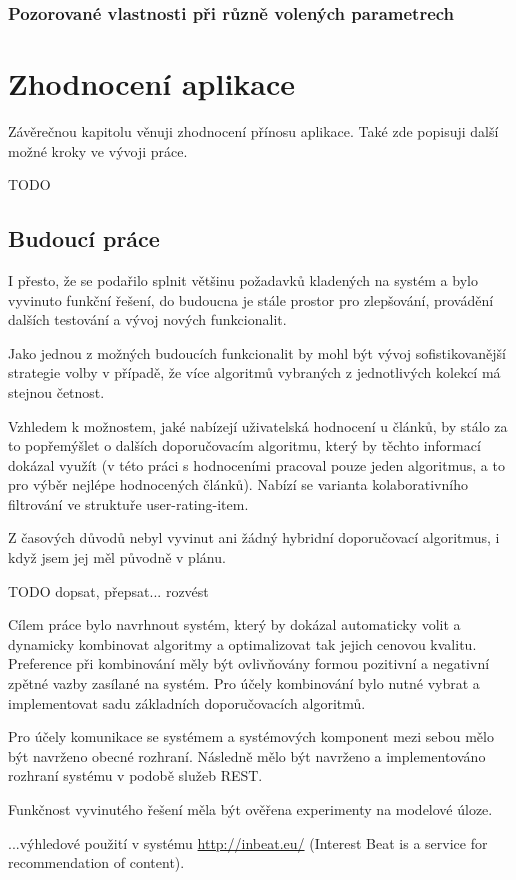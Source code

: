 \documentclass[thesis=M,czech]{FITthesis}[2014/05/07]
\begin{document}
\subsection{Pozorované vlastnosti při různě volených parametrech}

\chapter{Zhodnocení aplikace}
\label{chap:futurework}	
Závěrečnou kapitolu věnuji zhodnocení přínosu aplikace. Také zde popisuji další možné kroky ve vývoji práce.

TODO

\section{Budoucí práce}
I přesto, že se podařilo splnit většinu požadavků kladených na systém a bylo vyvinuto funkční řešení, do budoucna je stále prostor pro zlepšování, provádění dalších testování a vývoj nových funkcionalit.

Jako jednou z možných budoucích funkcionalit by mohl být vývoj sofistikovanější strategie volby v případě, že více algoritmů vybraných z jednotlivých kolekcí má stejnou četnost.

Vzhledem k možnostem, jaké nabízejí uživatelská hodnocení u článků, by stálo za to popřemýšlet o dalších doporučovacím algoritmu, který by těchto informací dokázal využít (v této práci s hodnoceními pracoval pouze jeden algoritmus, a to pro výběr nejlépe hodnocených článků). Nabízí se varianta kolaborativního filtrování ve struktuře user-rating-item.

Z časových důvodů nebyl vyvinut ani žádný hybridní doporučovací algoritmus, i když jsem jej měl původně v plánu.

\begin{conclusion}
TODO dopsat, přepsat... rozvést

Cílem práce bylo navrhnout systém, který by dokázal automaticky volit a dynamicky kombinovat algoritmy a optimalizovat tak jejich cenovou kvalitu. Preference při kombinování měly být ovlivňovány formou pozitivní a negativní zpětné vazby zasílané na systém. Pro účely kombinování bylo nutné vybrat a implementovat sadu základních doporučovacích algoritmů. 

Pro účely komunikace se systémem a systémových komponent mezi sebou mělo být navrženo obecné rozhraní. Následně mělo být navrženo a implementováno rozhraní systému v podobě služeb REST.

Funkčnost vyvinutého řešení měla být ověřena experimenty na modelové úloze.

...výhledové použití v systému \url{http://inbeat.eu/} (Interest Beat is a service for recommendation of content). 
\end{conclusion}
\end{document}
